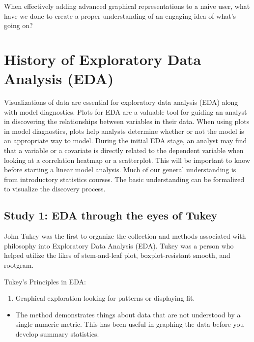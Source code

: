 \documentclass[print]{nuthesis}
\providecommand{\tightlist}{%
  \setlength{\itemsep}{0pt}\setlength{\parskip}{0pt}}
\begin{document}
When effectively adding advanced graphical representations to a naive user, what have we done to create a proper understanding of an engaging idea of what's going on?

\hypertarget{history-of-exploratory-data-analysis-eda}{%
\section{History of Exploratory Data Analysis (EDA)}\label{history-of-exploratory-data-analysis-eda}}

Visualizations of data are essential for exploratory data analysis (EDA) along with model diagnostics. Plots for EDA are a valuable tool for guiding an analyst in discovering the relationships between variables in their data. When using plots in model diagnostics, plots help analysts determine whether or not the model is an appropriate way to model. During the initial EDA stage, an analyst may find that a variable or a covariate is directly related to the dependent variable when looking at a correlation heatmap or a scatterplot. This will be important to know before starting a linear model analysis. Much of our general understanding is from introductory statistics courses. The basic understanding can be formalized to visualize the discovery process.

\hypertarget{study-1-eda-through-the-eyes-of-tukey}{%
\subsection{Study 1: EDA through the eyes of Tukey}\label{study-1-eda-through-the-eyes-of-tukey}}

John Tukey was the first to organize the collection and methods associated with philosophy into Exploratory Data Analysis (EDA). Tukey was a person who helped utilize the likes of stem-and-leaf plot, boxplot-resistant smooth, and rootgram.

Tukey's Principles in EDA:

\begin{enumerate}
\def\labelenumi{\arabic{enumi}.}
\tightlist
\item
  Graphical exploration looking for patterns or displaying fit.
\end{enumerate}

\begin{itemize}
\tightlist
\item
  The method demonstrates things about data that are not understood by a single numeric metric. This has been useful in graphing the data before you develop summary statistics.
\end{itemize}
\end{document}
